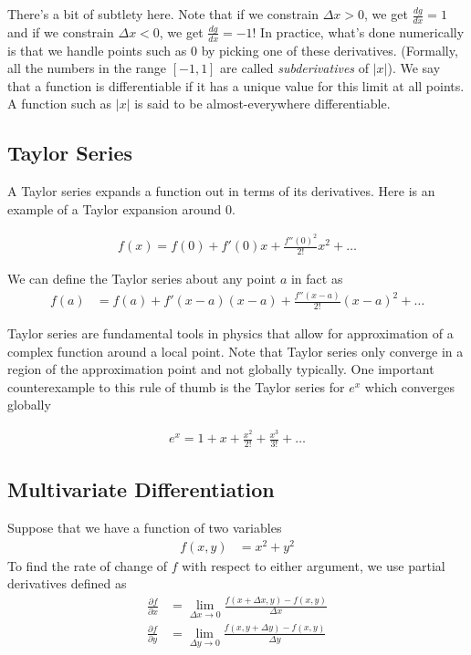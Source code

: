 \documentclass[book.tex]{subfiles}
\begin{document}
There's a bit of subtlety here. Note that if we constrain $\Delta x > 0$, we get $\frac{dg}{dx} = 1$ and if we constrain $\Delta x < 0$, we get $\frac{dg}{dx} = -1$! In practice, what's done numerically is that we handle points such as $0$ by picking one of these derivatives. (Formally, all the numbers in the range $[-1, 1]$ are called \textit{subderivatives} of $|x|$). We say that a function is differentiable if it has a unique value for this limit at all points. A function such as $|x|$ is said to be almost-everywhere differentiable.

\subsection{Taylor Series}

A Taylor series expands a function out in terms of its derivatives. Here is an example of a Taylor expansion around $0$.

\begin{align}
    f(x) = f(0) + f'(0)x + \frac{f''(0)^2}{2!}x^2 + \dotsc
\end{align}

We can define the Taylor series about any point $a$ in fact as
\begin{align}
    f(a) &= f(a) + f'(x-a)(x-a) + \frac{f''(x-a)}{2!} (x-a)^2 + \dotsc
\end{align}

Taylor series are fundamental tools in physics that allow for approximation of a complex function around a local point. Note that Taylor series only converge in a region of the approximation point and not globally typically. One important counterexample to this rule of thumb is the Taylor series for $e^x$ which converges globally

\begin{align}
    e^x = 1 + x + \frac{x^2}{2!} + \frac{x^3}{3!} + \dotsc
\end{align}

\subsection{Multivariate Differentiation}

Suppose that we have a function of two variables
\begin{align}
    f(x, y) &= x^2 + y^2
\end{align}
To find the rate of change of $f$ with respect to either argument, we use partial derivatives defined as
\begin{align}
    \frac{\partial f}{\partial x} &= \lim_{\Delta x \to 0} \frac{f(x + \Delta x, y) - f(x, y)}{\Delta x }\\
    \frac{\partial f}{\partial y} &= \lim_{\Delta y \to 0} \frac{f(x, y + \Delta y) - f(x, y)}{\Delta y}
\end{align}
\end{document}
